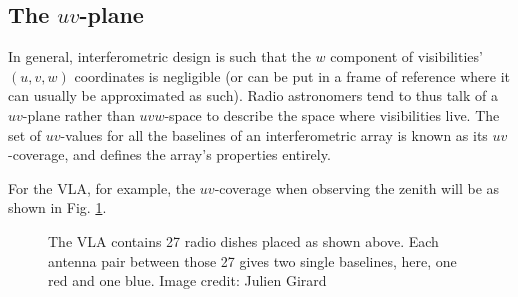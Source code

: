 \subsection{The $uv$-plane}

\pg
In general, interferometric design is such that the $w$ component of visibilities' $(u,v,w)$ coordinates is negligible (or can be put in a frame of reference where it can usually be approximated as such). Radio astronomers tend to thus talk of a $uv$-plane rather than $uvw$-space to describe the space where visibilities live. The set of $uv$-values for all the baselines of an interferometric array is known as its $uv$-coverage, and defines the array's properties entirely.

\pg
For the VLA, for example, the $uv$-coverage when observing the zenith will be as shown in Fig. \ref{fig.vla.uvcoverage}.

\begin{figure}[h]
\centering
{}
\caption{\label{fig.vla.uvcoverage} The VLA contains 27 radio dishes placed as shown above. Each antenna pair between those 27 gives two single baselines, here, one red and one blue. Image credit: Julien Girard}
\end{figure}


